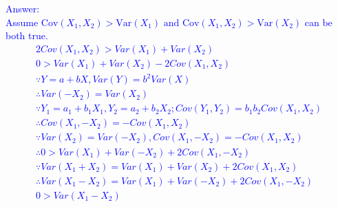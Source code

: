 \documentclass[letterpaper, 11pt]{article}
\begin{document}
\textcolor{blue}{Answer: \\
Assume $\textrm{Cov}(X_1,X_2)>\textrm{Var}(X_1) \mbox{ and } \textrm{Cov}(X_1,X_2)>\textrm{Var}(X_2)$ can be both true.
\begin{align}
2Cov(X_1, X_2) > Var(X_1) + Var(X_2)\\
0 > Var(X_1) + Var(X_2) - 2Cov(X_1, X_2) \\
\because Y = a + bX, Var(Y) = b^2Var(X)\\
\therefore Var(-X_2) = Var(X_2)\\
\because Y_1 = a_1 + b_1X_1, Y_2 = a_2 + b_2X_2; Cov(Y_1, Y_2) = b_1b_2Cov(X_1, X_2)\\
\therefore Cov(X_1, -X_2) = -Cov(X_1, X_2)\\
\because Var(X_2) = Var(-X_2), Cov(X_1, -X_2) = -Cov(X_1, X_2)\\
\therefore 0 > Var(X_1) + Var(-X_2) + 2Cov(X_1, -X_2) \\
\because Var(X_1 + X_2) = Var(X_1) + Var(X_2) + 2Cov(X_1, X_2)\\
\therefore Var(X_1 - X_2) = Var(X_1) + Var(-X_2) + 2Cov(X_1, -X_2)\\
0 > Var(X_1 - X_2)
\end{align}
}\\
\end{document}
